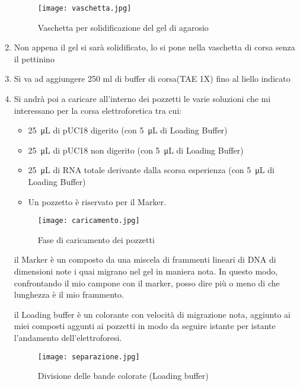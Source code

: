 \documentclass{article}
\begin{document}
\begin{enumerate}
\begin{figure}[H]
\centering
\texttt{[image: vaschetta.jpg]}
\caption{Vaschetta per solidificazione del gel di agarosio}
\label{vaschetta}

\end{figure}


\item Non appena il gel si sarà solidificato, lo si pone nella vaschetta di corsa senza il pettinino

\item Si va ad aggiungere 250 ml di buffer di corsa(TAE 1X) fino al liello indicato

\item Si andrà poi a caricare all'interno dei pozzetti le varie soluzioni che mi interessano per la corsa elettroforetica tra cui: 

\begin{itemize}

\item \SI{25}{\micro\liter} di pUC18 digerito (con \SI{5}{\micro\liter} di Loading Buffer)
\item \SI{25}{\micro\liter} di pUC18 non digerito (con \SI{5}{\micro\liter} di Loading Buffer)
\item \SI{25}{\micro\liter} di RNA totale derivante dalla scorsa esperienza (con \SI{5}{\micro\liter} di Loading Buffer)
\item Un pozzetto è riservato per il Marker.

\end{itemize}

\begin{figure}[H]

\centering
\texttt{[image: caricamento.jpg]}
\caption{Fase di caricamento dei pozzetti}
\label{cricamento}

\end{figure}

il Marker è un composto da una miscela di frammenti lineari di DNA di dimensioni note i quai migrano nel gel in maniera nota. In questo modo, confrontando il mio campone con il marker, posso dire più o meno di che lunghezza è il mio frammento. 

il Loading buffer è un colorante con velocità di migrazione nota, aggiunto ai miei composti aggunti ai pozzetti in modo da seguire istante per istante l'andamento dell'elettroforesi. 

\begin{figure}[H]

\centering
\texttt{[image: separazione.jpg]}
\caption{Divisione delle bande colorate (Loading buffer)}
\label{loading_bufer}


\end{figure}
\end{enumerate}
\end{document}
